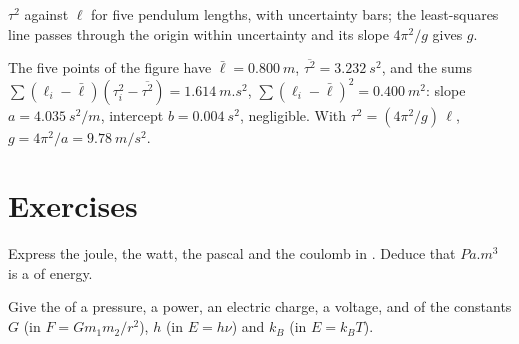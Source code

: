 \begin{omfigure}

{\small $\tau^2$ against $\ell$ for five pendulum lengths, with
uncertainty bars; the least-squares line passes through the origin
within uncertainty and its slope $4\pi^2/g$ gives $g$.}
\end{omfigure}

\begin{example}\label{ex:b1:units-dimensions:slope}
The five points of the figure have $\bar\ell = \qty{0.800}{m}$,
$\overline{\tau^2} = \qty{3.232}{s^2}$, and the sums
$\sum (\ell_i - \bar\ell)(\tau_i^2 - \overline{\tau^2}) = \qty{1.614}{m.s^2}$,
$\sum (\ell_i - \bar\ell)^2 = \qty{0.400}{m^2}$: slope
$a = \qty{4.035}{s^2/m}$, intercept $b = \qty{0.004}{s^2}$, negligible. With
$\tau^2 = (4\pi^2/g)\,\ell$, $g = 4\pi^2/a = \qty{9.78}{m/s^2}$.
\end{example}

\section{Exercises}

\begin{exercise}[$\star$]\label{exo:b1:units-dimensions:1}
Express the joule, the watt, the pascal and the coulomb in .
Deduce that $\unit{Pa.m^3}$ is a  of energy.
\end{exercise}

\begin{exercise}[$\star$]\label{exo:b1:units-dimensions:2}
Give the  of a pressure, a power, an electric charge, a
voltage, and of the constants $G$ (in $F = Gm_1m_2/r^2$), $h$ (in
$E = h\nu$) and $k_B$ (in $E = k_B T$).
\end{exercise}

